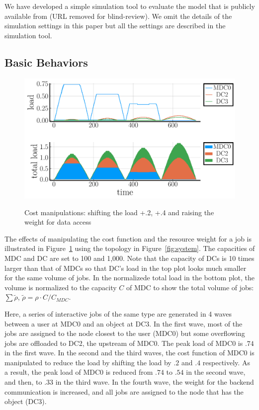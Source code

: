 
We have developed a simple simulation tool to evaluate the model
that is publicly available from (URL removed for blind-review).
We omit the details of the simulation settings in this paper but all
the settings are described in the simulation tool.

\subsection{Basic Behaviors}

\begin{figure}[tb]
  \begin{center}
    \includegraphics[width=1.0\columnwidth]{fig6.pdf}
    \vspace{-2.0ex}
    \caption{Cost manipulations: shifting the load +.2,
      +.4 and raising the weight for data access}
    \smallskip
    \raggedright
    \small
    \label{fig:lowering}
  \end{center}
\end{figure}

The effects of manipulating the cost function and the resource weight
for a job is illustrated in Figure~\ref{fig:lowering} using the
topology in Figure~\ref{fig:system}.
The capacities of MDC and DC are set to 100 and 1,000.
Note that the capacity of DCs is 10 times larger than that of MDCs
so that DC's load in the top plot looks much smaller for the same
volume of jobs.
In the normalizede total load in the bottom plot, the volume is normalized
to the capacity $C$ of MDC to show the total volume of jobs:
$\sum \tilde{\rho}$, \:$\tilde{\rho} = \rho \cdot C/C_{MDC}$.

Here, a series of interactive jobs of the same type are generated in
4 waves between a user at MDC0 and an object at DC3.
In the first wave,  most of the jobs are assigned to the node closest
to the user (MDC0) but some overflowing jobs are offloaded to DC2, the
upstream of MDC0.
The peak load of MDC0 is $.74$ in the first wave.
In the second and the third waves, the cost function of MDC0 is
manipulated to reduce the load by shifting the load by $.2$ and $.4$
respectively. As a result, the peak load of MDC0 is
reduced from $.74$ to $.54$ in the second wave, and then, to $.33$ in the
third wave.
In the fourth wave, the weight for the backend communication is
increased, and all jobs are assigned to the node that has the object
(DC3).

